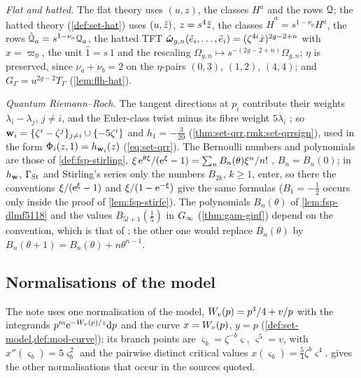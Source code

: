 \emph{Flat and hatted.} The flat theory uses $(u,z)$, the classes $H^a$ and the rows $\mathcal{Q}$; the hatted theory (\cref{def:set-hat}) uses $(u,\hat{z})$, $z=s^4\hat{z}$, the classes $\hat H^a=s^{1-\nu_a}H^a$, the rows $\hat{\mathcal{Q}}_a=s^{1-\nu_a}\mathcal{Q}_a$, the hatted TFT $\hat{\boldsymbol{\omega}}_{g,n}(\tilde e_i,\dots,\tilde e_i)=(\zeta^{4i}\hat x)^{2g-2+n}$ with $\hat x=\varpi_0$, the unit $\hat1=s\,1$ and the rescaling $\Omega_{g,n}\mapsto s^{-(2g-2+n)}\Omega_{g,n}$; $\eta$ is preserved, since $\nu_a+\nu_b=2$ on the $\eta$-pairs $(0,3)$, $(1,2)$, $(4,4)$; and $G_\Gamma=u^{2g-2}T_\Gamma$ (\cref{lem:flh-hat}).

\emph{Quantum Riemann--Roch.} The tangent directions at $p_i$ contribute their weights $\lambda_i-\lambda_j$, $j\neq i$, and the Euler-class twist minus its fibre weight $5\lambda_i$ \cite[(10)]{LP20}; so $\mathbf{w}_i=\{\zeta^i-\zeta^j\}_{j\neq i}\cup\{-5\zeta^i\}$ and $h_1=-\frac3{20}$ (\cref{thm:set-qrr,rmk:set-qrrsign}), used in the form $\Phi_i(z,1)=h_{\mathbf{w}_i}(z)$ (\cref{eq:set-qrr}). The Bernoulli numbers and polynomials are those of \cref{def:fsp-stirling}, $\xi\,\mathrm{e}^{\theta\xi}/(\mathrm{e}^\xi-1)=\sum_nB_n(\theta)\xi^n/n!$ \cite[24.2.3]{DLMF}, $B_n=B_n(0)$; in $h_{\mathbf{w}}$, $\Gamma_{\mathrm{St}}$ and Stirling's series only the numbers $B_{2k}$, $k\geq1$, enter, so there the conventions $\xi/(\mathrm{e}^\xi-1)$ and $\xi/(1-\mathrm{e}^{-\xi})$ give the same formulas ($B_1=-\frac12$ occurs only inside the proof of \cref{lem:fsp-stirfe}). The polynomials $B_n(\theta)$ of \cref{lem:fsp-dlmf5118} and the values $B_{5l+1}(\frac15)$ in $G_{\infty}$ (\cref{thm:gam-ginf}) depend on the convention, which is that of \cite[24.2.3]{DLMF}; the other one would replace $B_n(\theta)$ by $B_n(\theta+1)=B_n(\theta)+n\theta^{n-1}$.

\subsection{Normalisations of the model}
\label{sec:sgn-model}

The note uses one normalisation of the model, $W_{v}(p)=p^4/4+v/p$ with the integrands $p^m\mathrm{e}^{-W_{v}(p)/z}\mathrm{d} p$ and the curve $x=W_{v}(p)$, $y=p$ (\cref{def:set-model,def:mod-curve}); its branch points are $\varsigma_b=\zeta^{-b}\varsigma$, $\varsigma^5=v$, with $x''(\varsigma_b)=5\varsigma_b^2$ and the pairwise distinct critical values $x(\varsigma_b)=\frac54\zeta^b\varsigma^4$.  gives the other normalisations that occur in the sources quoted.

